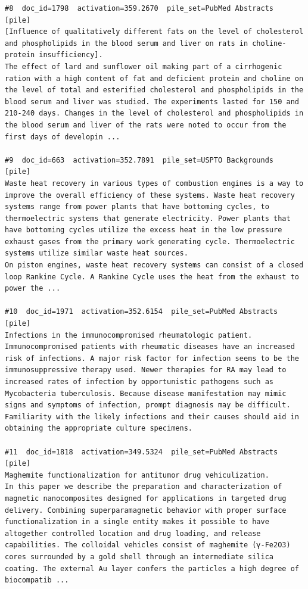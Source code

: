 \begin{verbatim}
#8  doc_id=1798  activation=359.2670  pile_set=PubMed Abstracts  [pile]
[Influence of qualitatively different fats on the level of cholesterol and phospholipids in the blood serum and liver on rats in choline-protein insufficiency].
The effect of lard and sunflower oil making part of a cirrhogenic ration with a high content of fat and deficient protein and choline on the level of total and esterified cholesterol and phospholipids in the blood serum and liver was studied. The experiments lasted for 150 and 210-240 days. Changes in the level of cholesterol and phospholipids in the blood serum and liver of the rats were noted to occur from the first days of developin ...

#9  doc_id=663  activation=352.7891  pile_set=USPTO Backgrounds  [pile]
Waste heat recovery in various types of combustion engines is a way to improve the overall efficiency of these systems. Waste heat recovery systems range from power plants that have bottoming cycles, to thermoelectric systems that generate electricity. Power plants that have bottoming cycles utilize the excess heat in the low pressure exhaust gases from the primary work generating cycle. Thermoelectric systems utilize similar waste heat sources.
On piston engines, waste heat recovery systems can consist of a closed loop Rankine Cycle. A Rankine Cycle uses the heat from the exhaust to power the ...

#10  doc_id=1971  activation=352.6154  pile_set=PubMed Abstracts  [pile]
Infections in the immunocompromised rheumatologic patient.
Immunocompromised patients with rheumatic diseases have an increased risk of infections. A major risk factor for infection seems to be the immunosuppressive therapy used. Newer therapies for RA may lead to increased rates of infection by opportunistic pathogens such as Mycobacteria tuberculosis. Because disease manifestation may mimic signs and symptoms of infection, prompt diagnosis may be difficult. Familiarity with the likely infections and their causes should aid in obtaining the appropriate culture specimens.

#11  doc_id=1818  activation=349.5324  pile_set=PubMed Abstracts  [pile]
Maghemite functionalization for antitumor drug vehiculization.
In this paper we describe the preparation and characterization of magnetic nanocomposites designed for applications in targeted drug delivery. Combining superparamagnetic behavior with proper surface functionalization in a single entity makes it possible to have altogether controlled location and drug loading, and release capabilities. The colloidal vehicles consist of maghemite (γ-Fe2O3) cores surrounded by a gold shell through an intermediate silica coating. The external Au layer confers the particles a high degree of biocompatib ...


\end{verbatim}
